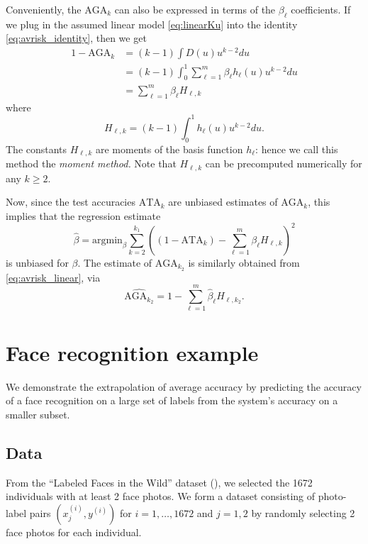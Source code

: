 \documentclass[twoside,11pt]{article}
\newcommand{\argmin}{\text{argmin}}
\begin{document}
Conveniently, the $\text{AGA}_k$ can also be expressed in terms of the $\beta_\ell$ coefficients.
If we plug in the assumed linear model \eqref{eq:linearKu} into the
identity \eqref{eq:avrisk_identity}, then we get
\begin{align}
1 - \text{AGA}_k &= (k-1)\int {D}(u) u^{k-2} du
\\&= (k-1)\int_0^1 \sum_{\ell = 1}^m \beta_\ell h_\ell(u) u^{k-2} du
\\&= \sum_{\ell = 1}^m \beta_\ell H_{\ell,k} \label{eq:avrisk_linear}
\end{align}
where
\begin{equation}
H_{\ell,k} = (k-1) \int_0^1 h_\ell(u) u^{k-2} du.
\end{equation}
The constants $H_{\ell, k}$ are moments of the basis function
$h_\ell$: hence we call this method the \emph{moment method.}  Note
that $H_{\ell, k}$ can be precomputed numerically for any $k \geq 2$.

Now, since the test accuracies $\text{ATA}_k$ are unbiased estimates
of $\text{AGA}_{k}$, this implies that the regression estimate
\[
\hat{\beta} = \argmin_\beta \sum_{k=2}^{k_1} \left( (1 - \text{ATA}_k) - \sum_{\ell=1}^m \beta_\ell H_{\ell, k}\right)^2
\]
is unbiased for $\beta$. The estimate of $\text{AGA}_{k_2}$ is similarly obtained
from \eqref{eq:avrisk_linear}, via
\begin{equation}\label{eq:avrisk_hat}
\widehat{\text{AGA}_{k_2}} = 1 - \sum_{\ell=1}^m \hat{\beta}_\ell H_{\ell, k_2}.
\end{equation}





\section{Face recognition example}\label{sec:extrapolation_example}

We demonstrate the extrapolation of average accuracy by predicting the
accuracy of a face recognition on a large set of labels from the
system's accuracy on a smaller subset.

\subsection{Data}
From the ``Labeled Faces in the Wild'' dataset (\cite{LFWTech}), we
selected the 1672 individuals with at least 2 face photos.  We form a
dataset consisting of photo-label pairs $(x_j^{(i)}, y^{(i)})$
for $i = 1,\hdots, 1672$ and $j = 1,2$ by randomly selecting 2 face
photos for each individual. 
\end{document}

